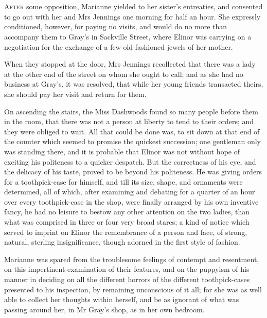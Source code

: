 \chapter[Chapter \thechapter]{}
\lettrine[lraise=0.3]{A}{fter} some opposition, Marianne yielded to her sister's entreaties, and consented to go out with her and Mrs Jennings one morning for half an hour. She expressly conditioned, however, for paying no visits, and would do no more than accompany them to Gray's in Sackville Street, where Elinor was carrying on a negotiation for the exchange of a few old-fashioned jewels of her mother.

When they stopped at the door, Mrs Jennings recollected that there was a lady at the other end of the street on whom she ought to call; and as she had no business at Gray's, it was resolved, that while her young friends transacted theirs, she should pay her visit and return for them.

On ascending the stairs, the Miss Dashwoods found so many people before them in the room, that there was not a person at liberty to tend to their orders; and they were obliged to wait. All that could be done was, to sit down at that end of the counter which seemed to promise the quickest succession; one gentleman only was standing there, and it is probable that Elinor was not without hope of exciting his politeness to a quicker despatch. But the correctness of his eye, and the delicacy of his taste, proved to be beyond his politeness. He was giving orders for a toothpick-case for himself, and till its size, shape, and ornaments were determined, all of which, after examining and debating for a quarter of an hour over every toothpick-case in the shop, were finally arranged by his own inventive fancy, he had no leisure to bestow any other attention on the two ladies, than what was comprised in three or four very broad stares; a kind of notice which served to imprint on Elinor the remembrance of a person and face, of strong, natural, sterling insignificance, though adorned in the first style of fashion.

Marianne was spared from the troublesome feelings of contempt and resentment, on this impertinent examination of their features, and on the puppyism of his manner in deciding on all the different horrors of the different toothpick-cases presented to his inspection, by remaining unconscious of it all; for she was as well able to collect her thoughts within herself, and be as ignorant of what was passing around her, in Mr Gray's shop, as in her own bedroom.

